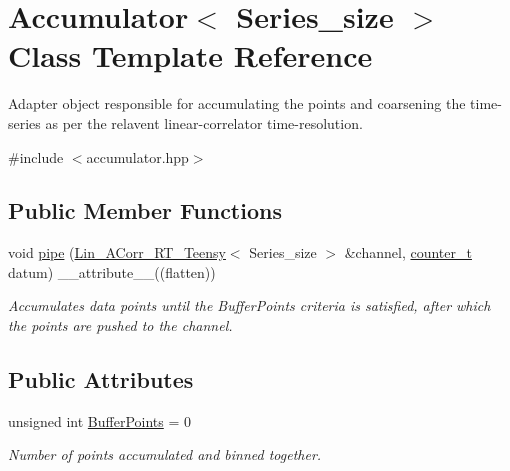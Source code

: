\hypertarget{classAccumulator}{}\section{Accumulator$<$ Series\+\_\+size $>$ Class Template Reference}
\label{classAccumulator}


Adapter object responsible for accumulating the points and coarsening the time-\/series as per the relavent linear-\/correlator time-\/resolution.  




{\ttfamily \#include $<$accumulator.\+hpp$>$}

\subsection*{Public Member Functions}
\begin{DoxyCompactItemize}
\item 
void \hyperlink{classAccumulator_a58b1133059f8c92fe6f5f0b229de668f}{pipe} (\hyperlink{classLin__ACorr__RT__Teensy}{Lin\+\_\+\+A\+Corr\+\_\+\+R\+T\+\_\+\+Teensy}$<$ Series\+\_\+size $>$ \&channel, \hyperlink{types_8hpp_a22f279793847eba127de149437848c48}{counter\+\_\+t} datum) \+\_\+\+\_\+attribute\+\_\+\+\_\+((flatten))
\begin{DoxyCompactList}\small\item\em Accumulates data points until the Buffer\+Points criteria is satisfied, after which the points are pushed to the channel. \end{DoxyCompactList}\end{DoxyCompactItemize}
\subsection*{Public Attributes}
\begin{DoxyCompactItemize}
\item 
unsigned int \hyperlink{classAccumulator_a1c24cae338768ee66f18f0abc2adea8c}{Buffer\+Points} = 0
\begin{DoxyCompactList}\small\item\em Number of points accumulated and binned together. \end{DoxyCompactList}\end{DoxyCompactItemize}
